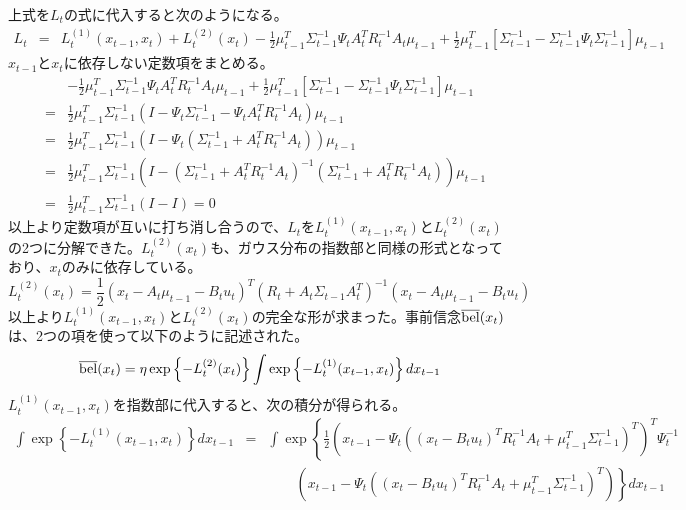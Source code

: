 \documentclass[dvipdfmx,a4paper]{jsarticle}
\begin{document}
上式を$L_t$の式に代入すると次のようになる。
\begin{eqnarray}
	L_t &=& L_t^{(1)}(x_{t - 1}, x_t) + L_t^{(2)}(x_t) - \frac{1}{2} \mu_{t - 1}^T \Sigma_{t - 1}^{-1} \Psi_t A_t^T R_t^{-1} A_t \mu_{t - 1} + \frac{1}{2} \mu_{t - 1}^T \left[ \Sigma_{t - 1}^{-1} - \Sigma_{t - 1}^{-1} \Psi_t \Sigma_{t - 1}^{-1} \right] \mu_{t - 1}
\end{eqnarray}
$x_{t - 1}$と$x_t$に依存しない定数項をまとめる。
\begin{eqnarray}
	&& -\frac{1}{2} \mu_{t - 1}^T \Sigma_{t - 1}^{-1} \Psi_t A_t^T R_t^{-1} A_t \mu_{t - 1} + \frac{1}{2} \mu_{t - 1}^T \left[ \Sigma_{t - 1}^{-1} - \Sigma_{t - 1}^{-1} \Psi_t \Sigma_{t - 1}^{-1} \right] \mu_{t - 1} \nonumber \\
	&=& \frac{1}{2} \mu_{t - 1}^T \Sigma_{t - 1}^{-1} \left( I - \Psi_t \Sigma_{t - 1}^{-1} - \Psi_t A_t^T R_t^{-1} A_t \right) \mu_{t - 1} \nonumber \\
	&=& \frac{1}{2} \mu_{t - 1}^T \Sigma_{t - 1}^{-1} \left( I - \Psi_t \left( \Sigma_{t - 1}^{-1} + A_t^T R_t^{-1} A_t \right) \right) \mu_{t - 1} \nonumber \\
	&=& \frac{1}{2} \mu_{t - 1}^T \Sigma_{t - 1}^{-1} \left( I - \left( \Sigma_{t - 1}^{-1} + A_t^T R_t^{-1} A_t \right)^{-1} \left( \Sigma_{t - 1}^{-1} + A_t^T R_t^{-1} A_t \right) \right) \mu_{t - 1} \nonumber \\
	&=& \frac{1}{2} \mu_{t - 1}^T \Sigma_{t - 1}^{-1} \left( I - I \right) = 0
\end{eqnarray}
以上より定数項が互いに打ち消し合うので、$L_t$を$L_t^{(1)}(x_{t - 1}, x_t)$と$L_t^{(2)}(x_t)$の2つに分解できた。$L_t^{(2)}(x_t)$も、ガウス分布の指数部と同様の形式となっており、$x_t$のみに依存している。
\begin{equation}
	L_t^{(2)}(x_t) = \frac{1}{2} \left( x_t - A_t \mu_{t - 1} - B_t u_t \right)^T \left( R_t + A_t \Sigma_{t - 1} A_t^T \right)^{-1} \left( x_t - A_t \mu_{t - 1} - B_t u_t \right)
\end{equation}
以上より$L_t^{(1)}(x_{t - 1}, x_t)$と$L_t^{(2)}(x_t)$の完全な形が求まった。事前信念$\operatorname{\overline{bel}}(x_t)$は、2つの項を使って以下のように記述された。
\begin{equation}
	\operatorname{\overline{bel}}(x_t) = \eta \exp \left\{ -L_t^{(2)}(x_t) \right\} \int \exp \left\{ -L_t^{(1)}(x_{t - 1}, x_t) \right\} dx_{t - 1}
\end{equation}
$L_t^{(1)}(x_{t - 1}, x_t)$を指数部に代入すると、次の積分が得られる。
\begin{eqnarray}
	\int \exp \left\{ -L_t^{(1)}(x_{t - 1}, x_t) \right\} dx_{t - 1} &=& \int \exp \left\{ \frac{1}{2} \left( x_{t - 1} - \Psi_t \left( \left( x_t - B_t u_t \right)^T R_t^{-1} A_t + \mu_{t - 1}^T \Sigma_{t - 1}^{-1} \right)^T \right)^T \Psi_t^{-1} \right. \nonumber \\
	&& \qquad \left. \left( x_{t - 1} - \Psi_t \left( \left( x_t - B_t u_t \right)^T R_t^{-1} A_t + \mu_{t - 1}^T \Sigma_{t - 1}^{-1} \right)^T \right) \right\} dx_{t - 1}
\end{eqnarray}
\end{document}
